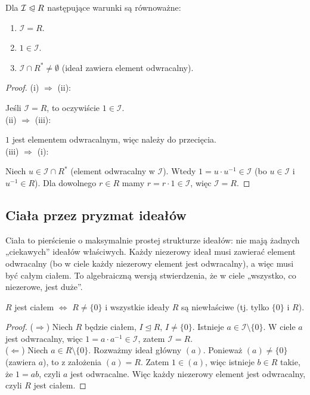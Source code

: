 \begin{fact}
Dla $\mathcal{I} \trianglelefteqslant R$ następujące warunki są równoważne:
\begin{enumerate}[label=\roman*)]
    \item $\mathcal{I} = R$.
    \item $1 \in \mathcal{I}$.
    \item $\mathcal{I} \cap R^* \neq \emptyset$ (ideał zawiera element odwracalny).
\end{enumerate}
\end{fact}

\begin{proof}
\noindent
\noindent (i) $\Rightarrow$ (ii): 

Jeśli $\mathcal{I} = R$, to oczywiście $1 \in \mathcal{I}$. \\
\noindent (ii) $\Rightarrow$ (iii):

$1$ jest elementem odwracalnym, więc należy do przecięcia. \\
\noindent (iii) $\Rightarrow$ (i):

Niech $u \in \mathcal{I} \cap R^{\ast}$ (element odwracalny w $\mathcal{I}$). Wtedy $1 = u \cdot u^{-1} \in \mathcal{I}$ (bo $u \in \mathcal{I}$ i $u^{-1} \in R$). Dla dowolnego $r \in R$ mamy $r = r \cdot 1 \in \mathcal{I}$, więc $\mathcal{I} = R$.
\end{proof}

\subsection*{Ciała przez pryzmat ideałów}

\begin{intuition}
Ciała to pierścienie o maksymalnie prostej strukturze ideałów: nie mają żadnych „ciekawych” ideałów właściwych. Każdy niezerowy ideał musi zawierać element odwracalny (bo w ciele każdy niezerowy element jest odwracalny), a więc musi być całym ciałem. To algebraiczną wersją stwierdzenia, że w ciele „wszystko, co niezerowe, jest duże”.
\end{intuition}

\begin{fact}
$R$ jest ciałem $\iff$ $R \neq \{0\}$ i wszystkie ideały $R$ są niewłaściwe (tj. tylko $\{0\}$ i $R$).
\end{fact}

\begin{proof}
\noindent
($\Rightarrow$) Niech $R$ będzie ciałem, $I \trianglelefteq R$, $I \neq \{0\}$. Istnieje $a \in \mathcal{I} \setminus \{0\}$. W ciele $a$ jest odwracalny, więc $1 = a \cdot a^{-1} \in \mathcal{I}$, zatem $\mathcal{I} = R$. \\
($\Leftarrow$) Niech $a \in R \setminus \{0\}$. Rozważmy ideał główny $(a)$. Ponieważ $(a) \neq \{0\}$ (zawiera $a$), to z założenia $(a) = R$. Zatem $1 \in (a)$, więc istnieje $b \in R$ takie, że $1 = ab$, czyli $a$ jest odwracalne. Więc każdy niezerowy element jest odwracalny, czyli $R$ jest ciałem.
\end{proof}

